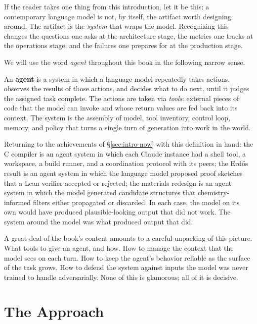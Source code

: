 If the reader takes one thing from this introduction, let it be
this: a contemporary language model is not, by itself, the artifact
worth designing around. The artifact is the \emph{system} that
wraps the model. Recognizing this changes the questions one asks at
the architecture stage, the metrics one tracks at the operations
stage, and the failures one prepares for at the production stage.

We will use the word \emph{agent} throughout this book in the
following narrow sense.

\begin{definitionbox}
An \textbf{agent} is a system in which a language model
repeatedly takes actions, observes the results of those actions,
and decides what to do next, until it judges the assigned task
complete. The actions are taken via \emph{tools}: external pieces
of code that the model can invoke and whose return values are fed
back into its context. The system is the assembly of model, tool
inventory, control loop, memory, and policy that turns a single
turn of generation into work in the world.
\end{definitionbox}

\noindent
Returning to the achievements of \S\ref{sec:intro-now} with this
definition in hand: the C compiler is an agent system in which
each Claude instance had a shell tool, a workspace, a build runner,
and a coordination protocol with its peers; the Erd\H{o}s result
is an agent system in which the language model proposed proof
sketches that a Lean verifier accepted or rejected; the materials
redesign is an agent system in which the model generated candidate
structures that chemistry-informed filters either propagated or
discarded. In each case, the model on its own would have produced
plausible-looking output that did not work. The system around the
model was what produced output that did.

A great deal of the book's content amounts to a careful unpacking
of this picture. What tools to give an agent, and how. How to
manage the context that the model sees on each turn. How to keep
the agent's behavior reliable as the surface of the task grows.
How to defend the system against inputs the model was never
trained to handle adversarially. None of this is glamorous;
all of it is decisive.

\section{The Approach}
\label{sec:intro-approach}

